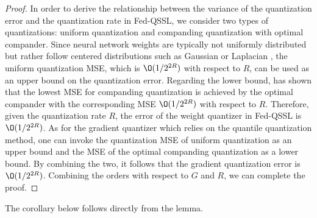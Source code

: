 \documentclass[a4paper,11pt]{article}
\begin{document}
\begin{proof}

In order to derive the relationship between the variance of the quantization error and the quantization rate in Fed-QSSL, we consider two types of quantizations: uniform quantization and companding quantization with optimal compander. Since neural network weights are typically not uniformly distributed but rather follow centered distributions such as Gaussian or Laplacian \cite{isik2022information}, the uniform quantization MSE, which is $\O(1/2^{2R})$ with respect to $R$, can be used as an upper bound on the quantization error. Regarding the lower bound, \cite{sun2011scalar} has shown that the lowest MSE for companding quantization is achieved by the optimal compander with the corresponding MSE $\O(1/2^{2R})$ with respect to $R$. Therefore, given the quantization rate $R$, the error of the weight quantizer in Fed-QSSL is $\O(1/2^{2R})$. As for the gradient quantizer which relies on the quantile quantization method, one can invoke the quantization MSE of uniform quantization as an upper bound and the MSE of the optimal companding quantization as a lower bound. By combining the two, it follows that the gradient quantization error is $\O(1/2^{2R})$.
Combining the orders with respect to $G$ and $R$, we can complete the proof.
\end{proof}


The corollary below follows directly from the lemma.
\end{document}
